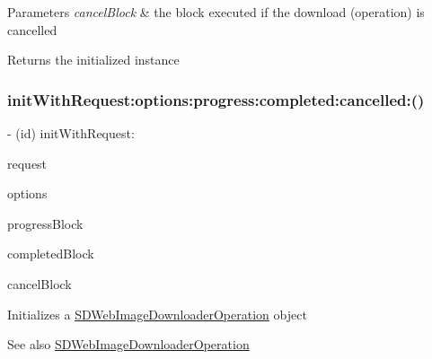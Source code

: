 \begin{DoxyParams}{Parameters}
{\em cancel\+Block} & the block executed if the download (operation) is cancelled\\
\hline
\end{DoxyParams}
\begin{DoxyReturn}{Returns}
the initialized instance 
\end{DoxyReturn}
\mbox{\label{interface_s_d_web_image_downloader_operation_af876b06c8170561e050278aec0460cb2}} 
\subsubsection{\texorpdfstring{init\+With\+Request\+:options\+:progress\+:completed\+:cancelled\+:()}{initWithRequest:options:progress:completed:cancelled:()}\hspace{0.1cm}{\footnotesize\ttfamily [2/3]}}
{\footnotesize\ttfamily -\/ (id) init\+With\+Request\+: \begin{DoxyParamCaption}\item[{(N\+S\+U\+R\+L\+Request $\ast$)}]{request }\item[{options:(S\+D\+Web\+Image\+Downloader\+Options)}]{options }\item[{progress:(S\+D\+Web\+Image\+Downloader\+Progress\+Block)}]{progress\+Block }\item[{completed:(S\+D\+Web\+Image\+Downloader\+Completed\+Block)}]{completed\+Block }\item[{cancelled:(S\+D\+Web\+Image\+No\+Params\+Block)}]{cancel\+Block }\end{DoxyParamCaption}}

Initializes a {\ttfamily \mbox{\hyperlink{interface_s_d_web_image_downloader_operation}{S\+D\+Web\+Image\+Downloader\+Operation}}} object

\begin{DoxySeeAlso}{See also}
\mbox{\hyperlink{interface_s_d_web_image_downloader_operation}{S\+D\+Web\+Image\+Downloader\+Operation}}
\end{DoxySeeAlso}

